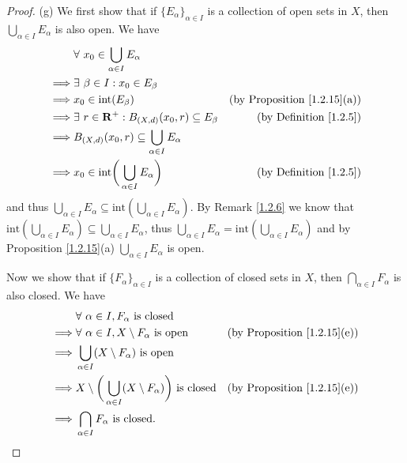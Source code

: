 \begin{proof}{(g)}
    We first show that if \(\{E_\alpha\}_{\alpha \in I}\) is a collection of open sets in \(X\), then \(\bigcup_{\alpha \in I} E_\alpha\) is also open.
    We have
    \begin{align*}
                 & \forall\ x_0 \in \bigcup_{\alpha \in I} E_\alpha                                                             \\
        \implies & \exists\ \beta \in I : x_0 \in E_\beta                                                                       \\
        \implies & x_0 \in \text{int}(E_\beta)                                        & \text{(by Proposition \ref{1.2.15}(a))} \\
        \implies & \exists\ r \in \mathbf{R}^+ : B_{(X, d)}(x_0, r) \subseteq E_\beta & \text{(by Definition \ref{1.2.5})}      \\
        \implies & B_{(X, d)}(x_0, r) \subseteq \bigcup_{\alpha \in I} E_\alpha                                                 \\
        \implies & x_0 \in \text{int}\bigg(\bigcup_{\alpha \in I} E_\alpha\bigg)      & \text{(by Definition \ref{1.2.5})}
    \end{align*}
    and thus \(\bigcup_{\alpha \in I} E_\alpha \subseteq \text{int}(\bigcup_{\alpha \in I} E_\alpha)\).
    By Remark \ref{1.2.6} we know that \(\text{int}(\bigcup_{\alpha \in I} E_\alpha) \subseteq \bigcup_{\alpha \in I} E_\alpha\), thus \(\bigcup_{\alpha \in I} E_\alpha = \text{int}(\bigcup_{\alpha \in I} E_\alpha)\) and by Proposition \ref{1.2.15}(a) \(\bigcup_{\alpha \in I} E_\alpha\) is open.

    Now we show that if \(\{F_\alpha\}_{\alpha \in I}\) is a collection of closed sets in \(X\), then \(\bigcap_{\alpha \in I} F_\alpha\) is also closed.
    We have
    \begin{align*}
                 & \forall\ \alpha \in I, F_\alpha \text{ is closed}                                                                                 \\
        \implies & \forall\ \alpha \in I, X \setminus F_\alpha \text{ is open}                             & \text{(by Proposition \ref{1.2.15}(e))} \\
        \implies & \bigcup_{\alpha \in I} (X \setminus F_\alpha) \text{ is open}                                                                     \\
        \implies & X \setminus \bigg(\bigcup_{\alpha \in I} (X \setminus F_\alpha)\bigg) \text{ is closed} & \text{(by Proposition \ref{1.2.15}(e))} \\
        \implies & \bigcap_{\alpha \in I} F_\alpha \text{ is closed}.
    \end{align*}
\end{proof}

